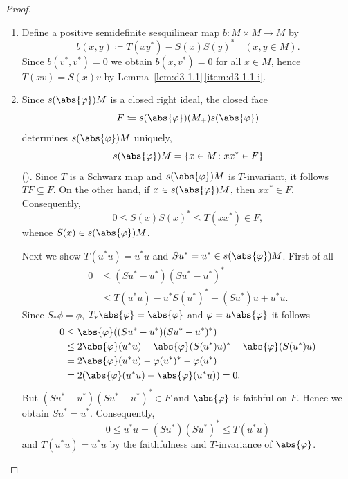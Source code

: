 \begin{proof}
\begin{enumerate}[\upshape (i), wide, labelindent=.25em]
\item 
Define a positive semidefinite sesquilinear map $b \colon M\times M \to M$ by
\[
b(x,y) \coloneq T(xy^{*}) - S(x)S(y)^{*} \quad (x, y\in M).
\]
Since $b(v^{*},v^{*}) = 0$ we obtain $b(x,v^{*}) = 0$ for all $x \in M$,  hence $T(xv) = S(x)v$ by Lemma~\ref{lem:d3-1.1}\,\ref{item:d3-1.1-i}.

\item
Since $s(\abs{\phi})M$ is a closed right ideal, the closed face 
%
\[
	F \coloneq s(\abs{\phi})(M_{+})s(\abs{\phi}) 
\]
%
determines $s(\abs{\phi})M$ uniquely, \ie
\[
s(\abs{\phi})M = \{x \in M \colon xx^{*} \in F\}
\]
(\textcite[Theorem 1.5.2]{pedersen:1979}). 
Since $T$ is a Schwarz map and $s(\abs{\phi})M$ is $T$-invariant, it follows $TF \subseteq F$.
On the other hand, if\/ $x \in s(\abs{\phi})M$, then $xx^{*} \in F$.
Consequently,
\[
0 \leq S(x)S(x)^{*} \leq T(xx^{*}) \in F,
\]
whence $S(x) \in s(\abs{\phi})M$.

Next we show $T(u^{*}u) = u^{*}u$ and $Su^{*} = u^{*} \in s(\abs{\phi})M$.
First of all
\begin{align*}
	0 &\leq (Su^{*} - u^{*})(Su^{*} - u^{*})^{*} \\
	& \leq T(u^{*}u) - u^{*}S(u^{*})^{*} - (Su^{*})u + u^{*}u.
\end{align*}
Since $ S_{*}\phi = \phi $, $ T_{*}\abs{\phi} = \abs{\phi} $ and $ \phi = u\abs{\phi} $ it follows
\begin{align*}
	0 &\leq \abs{\phi}((Su^{*} - u^{*})(Su^{*} - u^{*})^{*}) \\
	& \leq 2\abs{\phi}(u^{*}u) - \abs{\phi}(S(u^{*})u)^{*} - \abs{\phi}(S(u^{*})u) \\
	& = 2\abs{\phi}(u^{*}u) - \phi(u^{*})^{*} - \phi(u^{*}) \\
	& = 2(\abs{\phi}(u^{*}u) - \abs{\phi}(u^{*}u)) = 0.
\end{align*}
But $(Su^{*} - u^{*})(Su^{*} - u^{*})^{*} \in F$ and $\abs{\phi}$ is faithful on $F$.
Hence we obtain $Su^{*} = u^{*}$.
Consequently,
\[
	0 \leq u^{*}u = (Su^{*})(Su^{*})^{*} \leq T(u^{*}u)
\]
and $T(u^{*}u) = u^{*}u$ by the faithfulness and $T$-invariance of\/ $\abs{\phi}$.
\qedhere
\end{enumerate}
\end{proof}

